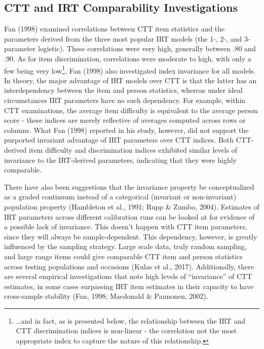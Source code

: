 \documentclass[
  man]{apa6}
\begin{document}
\hypertarget{ctt-and-irt-comparability-investigations}{%
\subsection{CTT and IRT Comparability Investigations}\label{ctt-and-irt-comparability-investigations}}

Fan (1998) examined correlations between CTT item statistics and the parameters derived from the three most popular IRT models (the 1-, 2-, and 3-parameter logistic). These correlations were very high, generally between .80 and .90. As for item discrimination, correlations were moderate to high, with only a few being very low\footnote{\ldots and in fact, as is presented below, the relationship between the IRT and CTT discrimination indices is non-linear - the correlation not the most appropriate index to capture the nature of this relationship.}. Fan (1998) also investigated index invariance for all models. In theory, the major advantage of IRT models over CTT is that the latter has an interdependency between the item and person statistics, whereas under ideal circumstances IRT parameters have no such dependency. For example, within CTT examinations, the average item difficulty is equivalent to the average person score - these indices are merely reflective of averages computed across rows or columns. What Fan (1998) reported in his study, however, did not support the purported invariant advantage of IRT parameters over CTT indices. Both CTT-derived item difficulty and discrimination indices exhibited similar levels of invariance to the IRT-derived parameters, indicating that they were highly comparable.

There have also been suggestions that the invariance property be conceptualized as a graded continuum instead of a categorical (invariant or non-invariant) population property (Hambleton et al., 1991; Rupp \& Zumbo, 2004). Estimates of IRT parameters across different calibration runs can be looked at for evidence of a possible lack of invariance. This doesn't happen with CTT item parameters, since they will always be sample-dependent. This dependency, however, is greatly influenced by the sampling strategy. Large scale data, truly random sampling, and large range items could give comparable CTT item and person statistics across testing populations and occasions (Kulas et al., 2017). Additionally, there are several empirical investigations that note high levels of ``invariance'' of CTT estimates, in some cases surpassing IRT item estimates in their capacity to have cross-sample stability (Fan, 1998; Macdonald \& Paunonen, 2002).
\end{document}
